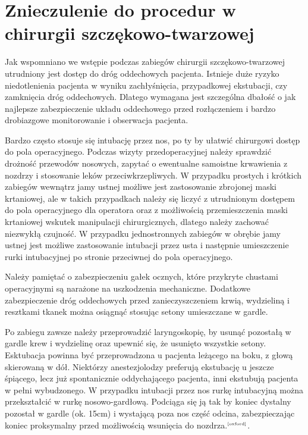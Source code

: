 \documentclass[a4paper, 12pt]{report}
\newcommand\cyt[1]{$^{\tiny{\cite{#1}}}$}
\begin{document}
\chapter{Znieczulenie do procedur w chirurgii szczękowo-twarzowej}

Jak wspomniano we wstępie podczas zabiegów chirurgii
szczękowo-twarzowej utrudniony jest dostęp do dróg oddechowych
pacjenta. Istnieje duże ryzyko niedotlenienia pacjenta w wyniku
zachłyśnięcia, przypadkowej ekstubacji, czy zamknięcia dróg
oddechowych. Dlatego wymagana jest szczególna dbałość o jak najlepsze
zabezpieczenie układu oddechowego przed rozłączeniem i bardzo
drobiazgowe monitorowanie i obserwacja pacjenta.

Bardzo często stosuje się intubację przez nos, po ty by ułatwić
chirurgowi dostęp do pola operacyjnego. Podczas wizyty
przedoperacyjnej należy sprawdzić drożność przewodów nosowych, zapytać
o ewentualne samoistne krwawienia z nozdrzy i stosowanie leków
przeciwkrzepliwych. W przypadku prostych i krótkich zabiegów wewnątrz
jamy ustnej możliwe jest zastosowanie zbrojonej maski krtaniowej, ale
w takich przypadkach należy się liczyć z utrudnionym dostępem do pola
operacyjnego dla operatora oraz z możliwością przemieszczenia maski
krtaniowej wskutek manipulacji chirurgicznych, dlatego należy zachować
niezwykłą czujność. W przypadku jednostronnych zabiegów w obrębie jamy
ustnej jest możliwe zastosowanie intubacji przez usta i następnie
umieszczenie rurki intubacyjnej po stronie przeciwnej do pola
operacyjnego.

Należy pamiętać o zabezpieczeniu gałek ocznych, które przykryte
chustami operacyjnymi są narażone na uszkodzenia
mechaniczne. Dodatkowe zabezpieczenie dróg oddechowych przed
zanieczyszczeniem krwią, wydzieliną i resztkami tkanek można osiągnąć
stosując setony umieszczane w gardle.

Po zabiegu zawsze należy przeprowadzić laryngoskopię, by usunąć
pozostałą w gardle krew i wydzielinę oraz upewnić się, że usunięto
wszystkie setony. Esktubacja powinna być przeprowadzona u pacjenta
leżącego na boku, z głową skierowaną w dół. Niektórzy anestezjolodzy
preferują ekstubację u jeszcze śpiącego, lecz już spontanicznie
oddychającego pacjenta, inni ekstubują pacjenta w pełni wybudzonego. W
przypadku intubacji przez nos rurkę intubacyjną można przekształcić w
rurkę nosowo-gardłową. Podciąga się ją tak by koniec dystalny pozostał
w gardle (ok. 15cm) i wystającą poza nos część odcina, zabezpieczając
koniec proksymalny przed możliwością wsunięcia do
nozdrza.\cyt{oxford}.
\end{document}
